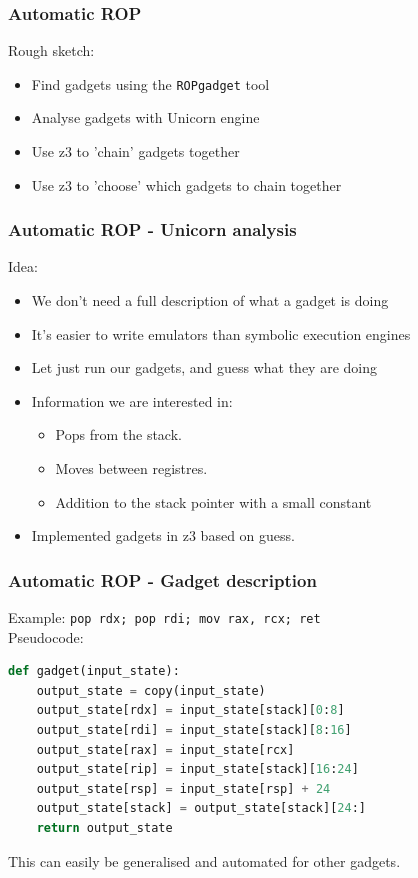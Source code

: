 \documentclass{beamer}
\begin{document}
\begin{frame}
    \frametitle{Automatic ROP}
    Rough sketch:
    \begin{itemize}
        \item Find gadgets using the \texttt{ROPgadget} tool 
        \item Analyse gadgets with Unicorn engine
        \item Use z3 to 'chain' gadgets together
        \item Use z3 to 'choose' which gadgets to chain together
    \end{itemize}
\end{frame}


\begin{frame}
    \frametitle{Automatic ROP - Unicorn analysis}
    Idea:
    \begin{itemize}
        \item We don't need a full description of what a gadget is doing
        \item It's easier to write emulators than symbolic execution engines
        \item Let just run our gadgets, and guess what they are doing
        \item Information we are interested in:
            \begin{itemize}
                \item Pops from the stack.
                \item Moves between registres.
                \item Addition to the stack pointer with a small constant
            \end{itemize}
        \item Implemented gadgets in z3 based on guess.
    \end{itemize}
\end{frame}

\begin{frame}[fragile]
    \frametitle{Automatic ROP - Gadget description}
    Example: \texttt{pop rdx; pop rdi; mov rax, rcx; ret} \\
    Pseudocode:
    \begin{lstlisting}[language=python]
def gadget(input_state):
    output_state = copy(input_state)
    output_state[rdx] = input_state[stack][0:8]
    output_state[rdi] = input_state[stack][8:16]
    output_state[rax] = input_state[rcx]
    output_state[rip] = input_state[stack][16:24]
    output_state[rsp] = input_state[rsp] + 24
    output_state[stack] = output_state[stack][24:] 
    return output_state
    \end{lstlisting}
    This can easily be generalised and automated for other gadgets.
\end{frame}
\end{document}
